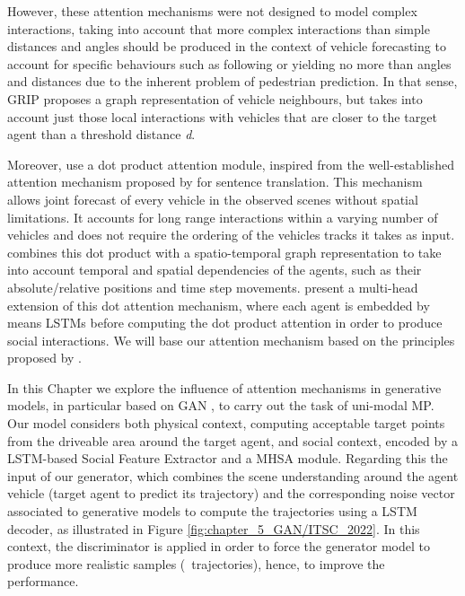 However, these attention mechanisms were not designed to model complex interactions, taking into account that more complex interactions than simple distances and angles should be produced in the context of vehicle forecasting to account for specific behaviours such as following or yielding no more than angles and distances due to the inherent problem of pedestrian prediction. In that sense, GRIP \cite{li2019grip} proposes a graph representation of vehicle neighbours, but takes into account just those local interactions with vehicles that are closer to the target agent than a threshold distance \textit{d}. 

Moreover, \cite{vemula2018social} use a dot product attention module, inspired from the well-established attention mechanism proposed by \cite{vaswani2017attention} for sentence translation. This mechanism allows joint forecast of every vehicle in the observed scenes without spatial limitations. It accounts for long range interactions within a varying number of vehicles and does not require the ordering of the vehicles tracks it takes as input. \cite{vemula2018social} combines this dot product with a spatio-temporal graph representation to take into account temporal and spatial dependencies of the agents, such as their absolute/relative positions and time step movements. \cite{mercat2020multi} present a multi-head extension of this dot attention mechanism, where each agent is embedded by means \acp{LSTM} before computing the dot product attention in order to produce social interactions. We will base our attention mechanism based on the principles proposed by \cite{mercat2020multi}.

In this Chapter we explore the influence of attention mechanisms in generative models, in particular based on \ac{GAN} \cite{goodfellow2020generative}, to carry out the task of uni-modal \ac{MP}. Our model considers both physical context, computing acceptable target points from the driveable area around the target agent, and social context, encoded by a \ac{LSTM}-based Social Feature Extractor and a \acf{MHSA} module. Regarding this the input of our generator, which combines the scene understanding around the agent vehicle (target agent to predict its trajectory) and the corresponding noise vector associated to generative models to compute the trajectories using a \ac{LSTM} decoder, as illustrated in Figure \ref{fig:chapter_5_GAN/ITSC_2022}. In this context, the discriminator is applied in order to force the generator model to produce more realistic samples (\ie \ trajectories), hence, to improve the performance. 

